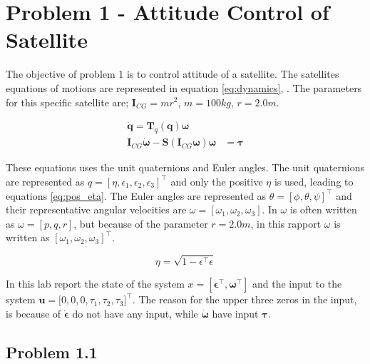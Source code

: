 \section*{Problem 1 - Attitude Control of Satellite}

The objective of problem 1 is to control attitude of a satellite. The satellites equations of motions are represented in equation \eqref{eq:dynamics},  \cite{Fossen2011}. The parameters for this specific satellite are; $\mathbf{I}_{CG} = mr^2$, $m = 100 kg$, $r = 2.0 m$.  

\begin{subequations}
\label{eq:dynamics}
	\begin{align}
		\dot{\mathbf{q}} = \mathbf{T}_q (\mathbf{q} ) \boldsymbol{\omega} \\
		\mathbf{I}_{CG} \dot{\boldsymbol{\omega}} - \mathbf{S} (\mathbf{I}_{CG} \boldsymbol{\omega} ) \boldsymbol{\omega} & =  \boldsymbol{\tau} 
		\label{eq:EOM_omega_dot}
	\end{align}	
\end{subequations}

These equations uses the unit quaternions and Euler angles. The unit  quaternions are represented as $q = [\eta, \epsilon_1, \epsilon_2, \epsilon_3]^\top$ and only the positive $\eta$ is used, leading to equations \eqref{eq:pos_eta}. The Euler angles are represented as $\theta = [\phi , \theta , \psi]^\top$ and their representative angular velocities are  $\omega = [\omega_1, \omega_2, \omega_3]$. In \cite{Fossen2011} $\omega$ is often written as $\omega = [p,q,r]$, but because of the parameter $r = 2.0m$, in this rapport $\omega$ is written as $[\omega_1, \omega_2, \omega_3]^\top$.

\begin{equation}
    \eta = \sqrt{1 - \epsilon^\top \epsilon} 
    \label{eq:pos_eta}
\end{equation}
 
In this lab report the state of the system $x = [ \boldsymbol{\epsilon}^\top, \boldsymbol{\omega}^\top]$ and the input to the system $\mathbf{u} = \boldsymbol[0,0,0,\tau_1, \tau_2, \tau_3]^\top$. The reason for the upper three zeros in the input, is because of $\dot{\boldsymbol{\epsilon}}$ do not have any input, while $\dot{\boldsymbol{\omega}}$ have input $\boldsymbol{\tau}$.

\subsection*{Problem 1.1}

